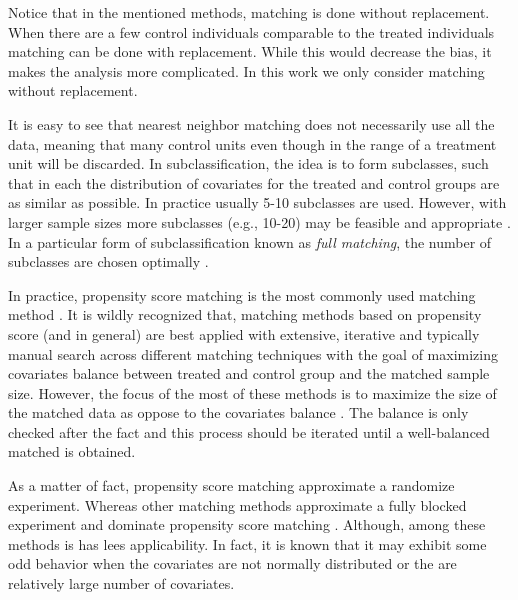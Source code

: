 {{{Notice that in the mentioned  methods,  matching is done without replacement. When there are a few control individuals comparable to the treated individuals matching can be done with replacement. While this would decrease the bias, it makes the analysis more complicated. In this work we only consider matching without replacement.


\vspace{.2cm}
 It is easy to see that nearest neighbor matching does not necessarily use all the data, meaning that many control units even though in the range of a treatment unit will be discarded. In subclassification, the idea is to form subclasses, such that in each the distribution  of covariates for the treated and control groups are as similar as possible. In practice usually 5-10 subclasses are used. However, with larger sample sizes more subclasses (e.g., 10-20) may be feasible and appropriate \cite{Lunceford04}. In a particular form of subclassification known as {\em full matching}, the number of subclasses are chosen optimally \cite{rosenbaum2002observational}.


\vspace{.2cm}

 In practice, propensity score matching is
the most commonly used matching method  \cite{king15}. It is wildly recognized that, matching methods
based on propensity score (and in general) are best applied with extensive, iterative and typically
manual search across different matching techniques with the goal of maximizing covariates
 balance between treated and control group and the matched sample size. However, the focus
 of the most of these methods is to maximize the size of the matched
 data as oppose to the covariates balance \cite{king15}. The balance is only checked after the fact
 and this process should be iterated until a well-balanced matched is obtained.

As a matter of fact, propensity score matching approximate a
randomize experiment. Whereas other matching methods approximate a fully blocked experiment and dominate propensity score
matching \cite{king15}. Although, among these methods is has lees applicability. In fact,
it is known that it may exhibit some odd behavior when the covariates
are not normally distributed or the are relatively large number of covariates.

}}}
